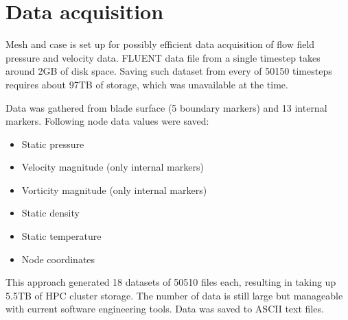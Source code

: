 \section{Data acquisition} \label{casedata}
Mesh and case is set up for possibly efficient data acquisition of flow field pressure and velocity data. FLUENT data file from a single timestep takes around 2GB of disk space. Saving such dataset from every of 50150 timesteps requires about 97TB of storage, which was unavailable at the time. 

Data was gathered from blade surface (5 boundary markers) and 13 internal markers. Following node data values were saved:

\begin{itemize}
\item Static pressure
\item Velocity magnitude (only internal markers)
\item Vorticity magnitude (only internal markers)
\item Static density
\item Static temperature
\item Node coordinates
\end{itemize}

This approach generated 18 datasets of 50510 files each, resulting in taking up 5.5TB of HPC cluster storage. The number of data is still large but manageable with current software engineering tools. Data was saved to ASCII text files.